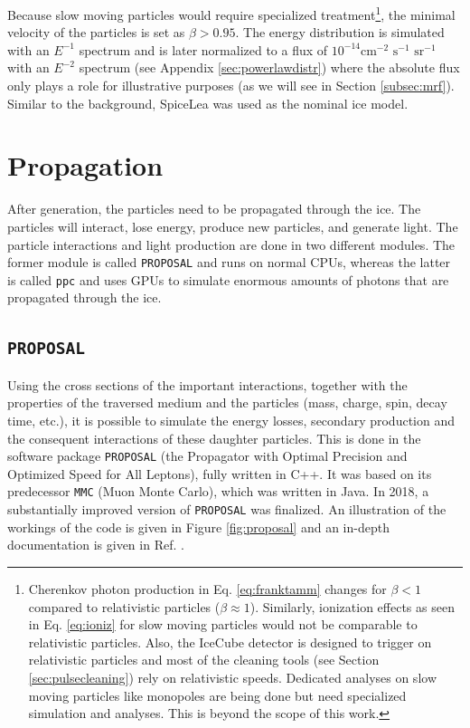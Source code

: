 \noindent Because slow moving particles would require specialized treatment\footnote{Cherenkov photon production in Eq. \ref{eq:franktamm} changes for $\beta < 1$ compared to relativistic particles ($\beta \approx 1$). Similarly, ionization effects as seen in Eq. \ref{eq:ioniz} for slow moving particles would not be comparable to relativistic particles. Also, the IceCube detector is designed to trigger on relativistic particles and most of the cleaning tools (see Section \ref{sec:pulsecleaning}) rely on relativistic speeds. Dedicated analyses on slow moving particles like monopoles are being done but need specialized simulation and analyses. This is beyond the scope of this work.}, the minimal velocity of the particles is set as $\beta > 0.95$. The energy distribution is simulated with an $E^{-1}$ spectrum and is later normalized to a flux of $10^{-14} \textrm{cm}^{-2} \textrm{ s}^{-1} \textrm{ sr}^{-1}$ with an $E^{-2}$ spectrum (see Appendix \ref{sec:powerlawdistr}) where the absolute flux only plays a role for illustrative purposes (as we will see in Section \ref{subsec:mrf}).\\

\noindent Similar to the background, SpiceLea was used as the nominal ice model.

\section{Propagation}
After generation, the particles need to be propagated through the ice. The particles will interact, lose energy, produce new particles, and generate light. The particle interactions and light production are done in two different modules. The former module is called \texttt{PROPOSAL} and runs on normal CPUs, whereas the latter is called \texttt{ppc} and uses GPUs to simulate enormous amounts of photons that are propagated through the ice.


\subsection{\texttt{PROPOSAL}}
Using the cross sections of the important interactions, together with the properties of the traversed medium and the particles (mass, charge, spin, decay time, etc.), it is possible to simulate the energy losses, secondary production and the consequent interactions of these daughter particles. This is done in the software package \texttt{PROPOSAL}  (the Propagator with Optimal Precision and Optimized Speed for All Leptons), fully written in C++. It was based on its predecessor \texttt{MMC} (Muon Monte Carlo), which was written in Java. In 2018, a substantially improved version of \texttt{PROPOSAL} was finalized. An illustration of the workings of the code is given in Figure \ref{fig:proposal} and an in-depth documentation is given in Ref. \cite{Dunsch:2018nsc}.

